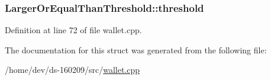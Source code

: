 \subsubsection[{threshold}]{ Larger\+Or\+Equal\+Than\+Threshold\+::threshold}\label{struct_larger_or_equal_than_threshold_a719c9b4c0f65d5bd7b4f5d3b97f88550}


Definition at line 72 of file wallet.\+cpp.



The documentation for this struct was generated from the following file\+:\begin{DoxyCompactItemize}
\item 
/home/dev/ds-\/160209/src/\hyperlink{wallet_8cpp}{wallet.\+cpp}\end{DoxyCompactItemize}
